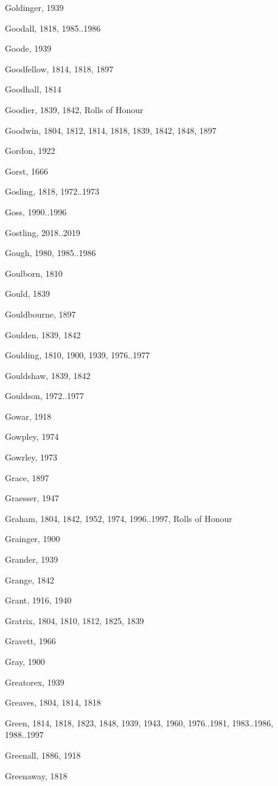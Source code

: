 \begin{theindex}
\item Goldinger, 1939
\item Goodall, 1818, 1985..1986
\item Goode, 1939
\item Goodfellow, 1814, 1818, 1897
\item Goodhall, 1814
\item Goodier, 1839, 1842, Rolls of Honour
\item Goodwin, 1804, 1812, 1814, 1818, 1839, 1842, 1848, 1897
\item Gordon, 1922
\item Gorst, 1666
\item Gosling, 1818, 1972..1973
\item Goss, 1990..1996
\item Gostling, 2018..2019
\item Gough, 1980, 1985..1986
\item Goulborn, 1810
\item Gould, 1839
\item Gouldbourne, 1897
\item Goulden, 1839, 1842
\item Goulding, 1810, 1900, 1939, 1976..1977
\item Gouldshaw, 1839, 1842
\item Gouldson, 1972..1977
\item Gowar, 1918
\item Gowpley, 1974
\item Gowrley, 1973
\item Grace, 1897
\item Graesser, 1947
\item Graham, 1804, 1842, 1952, 1974, 1996..1997, Rolls of Honour
\item Grainger, 1900
\item Grander, 1939
\item Grange, 1842
\item Grant, 1916, 1940
\item Gratrix, 1804, 1810, 1812, 1825, 1839
\item Gravett, 1966
\item Gray, 1900
\item Greatorex, 1939
\item Greaves, 1804, 1814, 1818
\item Green, 1814, 1818, 1823, 1848, 1939, 1943, 1960, 1976..1981, 1983..1986, 1988..1997
\item Greenall, 1886, 1918
\item Greenaway, 1818

\end{theindex}
